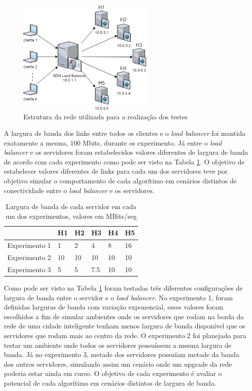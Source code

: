 \documentclass[12pt]{article}
\begin{document}
\begin{figure}[ht]
\centering
\includegraphics[width=0.6\textwidth]{images/network.png}
\caption{Estrutura da rede utilizada para a realização dos testes}
\label{fig:rede_proposta}
\end{figure}

A largura de banda dos links entre todos os clientes e o \textit{load balancer} foi mantida exatamente a mesma, 100 Mbits, durante os experimento. Já entre o \textit{load balancer} e os servidores foram estabelecidos valores diferentes de largura de banda de acordo com cada experimento como pode ser visto na Tabela \ref{largura_banda}. O objetivo de estabelecer valores diferentes de links para cada um dos servidores teve por objetivo simular o comportamento de cada algorítimo em cenários distintos de conectividade entre o \textit{load balancer} e os servidores.

\begin{table}[]
\centering
\caption{Largura de banda de cada servidor em cada um dos experimentos, valores em MBits/seg}
\label{largura_banda}
\begin{tabular}{llllll}
 & H1 & H2 & H3  & H4 & H5 \\\hline
Experimento 1                  & 1  & 2  & 4   & 8  & 16 \\
Experimento 2                  & 10 & 10 & 10  & 10 & 10 \\
Experimento 3                  & 5  & 5  & 7.5 & 10 & 10
\end{tabular}
\end{table}

Como pode ser visto na Tabela \ref{largura_banda} foram testadas três diferentes configurações de largura de banda entre o servidor e o \textit{load balancer}. No experimento 1, foram definidas larguras de banda com variação exponencial, esses valores foram escolhidos a fim de simular ambientes onde os servidores que rodam na borda da rede de uma cidade inteligente tenham menos largura de banda disponível que os servidores que rodam mais ao centro da rede. O experimento 2 foi planejado para testar um ambiente onde todos os servidores possuíssem a mesma largura de banda. Já no experimento 3, metade dos servidores possuíam metade da banda dos outros servidores, simulando assim um cenário onde um upgrade da rede poderia estar ainda em curso. O objetivo de cada experimento é avaliar o potencial de cada algorítimo em cenários distintos de largura de banda.
\end{document}
